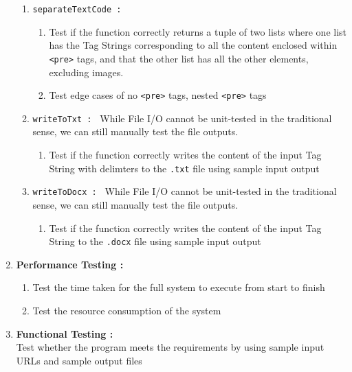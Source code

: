 \documentclass{scrreprt}
\begin{document}
\begin{enumerate}
\begin{enumerate}
        \item \texttt{separateTextCode : }
        \begin{enumerate}
            \item Test if the function correctly returns a tuple of two lists where one list has the Tag Strings corresponding to all the content enclosed within \texttt{<pre>} tags, and that the other list has all the other elements, excluding images.
            \item Test edge cases of no \texttt{<pre>} tags, nested \texttt{<pre>} tags
        \end{enumerate}

        \item \texttt{writeToTxt : }
        While File I/O cannot be unit-tested in the traditional sense, we can still manually test the file outputs.
        \begin{enumerate}
            \item Test if the function correctly writes the content of the input Tag String with delimters to the \texttt{.txt} file using sample input output
        \end{enumerate}

        \item \texttt{writeToDocx : }
        While File I/O cannot be unit-tested in the traditional sense, we can still manually test the file outputs.
        \begin{enumerate}
            \item Test if the function correctly writes the content of the input Tag String to the \texttt{.docx} file using sample input output
        \end{enumerate}

    \end{enumerate}
    \item \textbf{Performance Testing : } 
    \begin{enumerate}
        \item Test the time taken for the full system to execute from start to finish
        \item Test the resource consumption of the system
    \end{enumerate}
    \item \textbf{Functional Testing : } \\ Test whether the program meets the requirements by using sample input URLs and sample output files
\end{enumerate}
\end{document}
